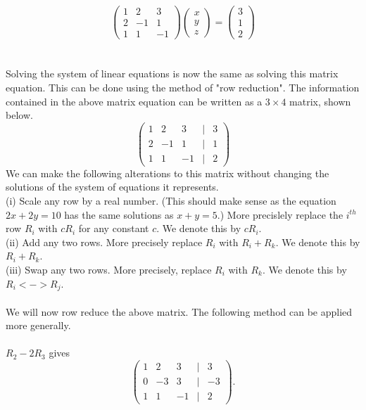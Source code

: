\documentclass{amsart}
\begin{document}
 \begin{equation*}
 \begin{pmatrix}
 1&2&3\\
 2&-1&1\\
 1&1&-1
 \end{pmatrix}
 \begin{pmatrix}
 x\\
 y\\
 z
 \end{pmatrix}
=
\begin{pmatrix}
 3\\
 1\\
 2
 \end{pmatrix}
\end{equation*}
\\
\\
Solving the system of linear equations is now the same as solving this matrix equation. This can be done using the method of "row reduction". The information contained in the above matrix equation can be written as a $3\times 4$ matrix, shown below.\\
 \begin{equation*}
 \begin{pmatrix}
 1&2&3&|&3\\
 2&-1&1&|&1\\
 1&1&-1&|&2
 \end{pmatrix}
\end{equation*}
We can make the following alterations to this matrix without changing the solutions of the system of equations it represents.\\
(i) Scale any row by a real number. (This should make sense as the equation $2x+2y=10$ has the same solutions as $x+y=5$.) More precislely replace the $i^{th}$ row $R_i$ with $cR_i$ for any constant $c$. We denote this by $cR_i$.\\
(ii) Add any two rows. More precisely replace $R_i$ with $R_i+R_k$. We denote this by $R_i+R_k$.\\
(iii) Swap any two rows. More precisely, replace $R_i$ with $R_k$. We denote this by $R_i<->R_j$.\\
\\
We will now row reduce the above matrix. The following method can be applied more generally.\\
\\
$R_2-2R_3$ gives
\begin{equation*}
 \begin{pmatrix}
 1&2&3&|&3\\
 0&-3&3&|&-3\\
 1&1&-1&|&2
 \end{pmatrix}.
\end{equation*}
\end{document}
